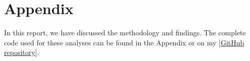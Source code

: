 \documentclass[11pt,letterpaper,twocolumn]{article}
\begin{document}
\section{Appendix}
In this report, we have discussed the methodology and findings. The complete code used for these analyses can be found in the Appendix or on my [\href{https://github.com/aelmahraoui/MSc-IPS/tree/main/01.%201st%20semester/Computer%20Vision/Assignments/A02} {GitHub repository}].


 
\end{document}
